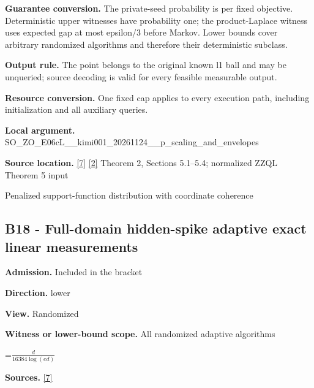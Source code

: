 \documentclass[10pt,a4paper]{article}
\newcommand{\AtlasMath}[1]{\par\begingroup\centering\setbox0=\hbox{$\displaystyle #1$}\ifdim\wd0>1.4\linewidth\typeout{ATLAS WIDE FORMULA: \the\wd0}\fi\ifdim\wd0>\linewidth\resizebox{\linewidth}{!}{\box0}\else\box0\fi\par\endgroup}
\begin{document}
\textbf{Guarantee conversion.} The private-seed probability is per fixed objective. Deterministic upper witnesses have probability one; the product-Laplace witness uses expected gap at most epsilon/3 before Markov. Lower bounds cover arbitrary randomized algorithms and therefore their deterministic subclass.



\textbf{Output rule.} The point belongs to the original known l1 ball and may be unqueried; source decoding is valid for every feasible measurable output.



\textbf{Resource conversion.} One fixed cap applies to every execution path, including initialization and all auxiliary queries.



\textbf{Local argument.} SO\_ZO\_E06cL\_\_kimi001\_202\allowbreak{}61124\_\_p\_scaling\_and\_env\allowbreak{}elopes



\textbf{Source location.} \href{https://github.com/WU-Wendao/Colombo/blob/main/colombo_sensorium/Complexity_altas/data/sources/colombo/COLOMBO_KIMI_001/kimi_001.pdf}{[7]} \href{https://arxiv.org/html/2607.16558v2}{[2]} Theorem 2, Sections 5.1--5.4; normalized ZZQL Theorem 5 input



Penalized support-function distribution with coordinate coherence



\subsection{B18 - Full-domain hidden-spike adaptive exact linear measurements}


\textbf{Admission.} Included in the bracket



\textbf{Direction.} lower



\textbf{View.} Randomized



\textbf{Witness or lower-bound scope.} All randomized adaptive algorithms



\AtlasMath{\frac{d}{16384\log(ed)}}


\textbf{Sources.} \href{https://github.com/WU-Wendao/Colombo/blob/main/colombo_sensorium/Complexity_altas/data/sources/colombo/COLOMBO_KIMI_001/kimi_001.pdf}{[7]}
\end{document}

